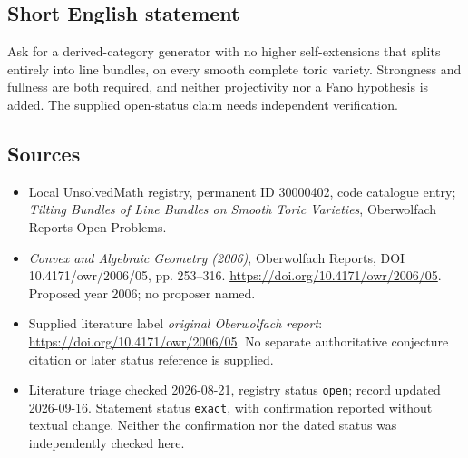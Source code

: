 \documentclass[11pt]{article}
\begin{document}
\subsection{Short English statement}
Ask for a derived-category generator with no higher self-extensions that splits entirely into line bundles, on every smooth complete toric variety. Strongness and fullness are both required, and neither projectivity nor a Fano hypothesis is added. The supplied open-status claim needs independent verification.
\subsection{Sources}
\begin{itemize}\item Local UnsolvedMath registry, permanent ID 30000402, code catalogue entry; \emph{Tilting Bundles of Line Bundles on Smooth Toric Varieties}, Oberwolfach Reports Open Problems.\item \emph{Convex and Algebraic Geometry (2006)}, Oberwolfach Reports, DOI 10.4171/owr/2006/05, pp. 253--316. \url{https://doi.org/10.4171/owr/2006/05}. Proposed year 2006; no proposer named.\item Supplied literature label \emph{original Oberwolfach report}: \url{https://doi.org/10.4171/owr/2006/05}. No separate authoritative conjecture citation or later status reference is supplied.\item Literature triage checked 2026-08-21, registry status \texttt{open}; record updated 2026-09-16. Statement status \texttt{exact}, with confirmation reported without textual change. Neither the confirmation nor the dated status was independently checked here.\end{itemize}
\end{document}
